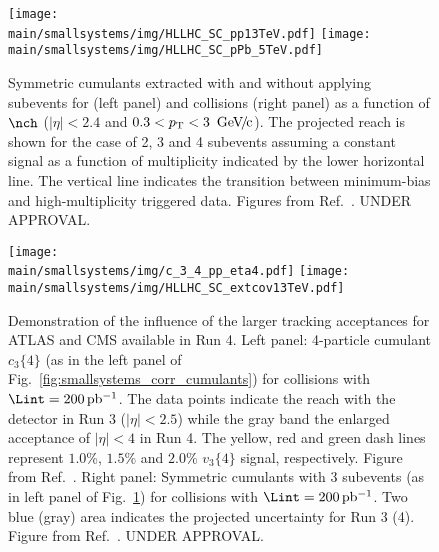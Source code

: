 \documentclass[../report.tex]{subfiles}
\providecommand{\main}{..}
\begin{document}
\begin{figure}[t!]
\centering
\texttt{[image: \\main/smallsystems/img/HLLHC\_SC\_pp13TeV.pdf]}
\texttt{[image: \\main/smallsystems/img/HLLHC\_SC\_pPb\_5TeV.pdf]}
\caption{Symmetric cumulants extracted with and without applying subevents for \pp (left panel) and \pPb collisions (right panel) as a function of $\nch$ ($|\eta| < 2.4$ and $0.3 < \pT < \unit[3]{\UGeVc}$). The projected reach is shown for the case of 2, 3 and 4 subevents assuming a constant signal as a function of multiplicity indicated by the lower horizontal line. The vertical line indicates the transition between minimum-bias and high-multiplicity triggered data. Figures from Ref.~\cite{CMS-PAS-FTR-18-026}. UNDER APPROVAL.}
\label{fig:smallsystems_corr_symmetriccumulants}
\end{figure}

\begin{figure}[t]
\centering
\texttt{[image: \\main/smallsystems/img/c\_3\_4\_pp\_eta4.pdf]}
\texttt{[image: \\main/smallsystems/img/HLLHC\_SC\_extcov13TeV.pdf]}
\caption{Demonstration of the influence of the larger tracking acceptances for ATLAS and CMS available in Run 4. Left panel: 4-particle cumulant $c_3\{4\}$ (as in the left panel of Fig.~\ref{fig:smallsystems_corr_cumulants}) for \pp collisions with $\Lint = \unit[200]{pb^{-1}}$. The data points indicate the reach with the detector in Run 3 ($|\eta| < 2.5$) while the gray band the enlarged acceptance of $|\eta| < 4$ in Run 4. The yellow, red and green dash lines represent $1.0\%$, $1.5\%$ and $2.0\%$ $v_3\{4\}$ signal, respectively. Figure from Ref.~\cite{ATL-PHYS-PUB-2018-020}. Right panel: Symmetric cumulants with 3 subevents (as in left panel of Fig.~\ref{fig:smallsystems_corr_symmetriccumulants}) for \pp collisions with $\Lint = \unit[200]{pb^{-1}}$. Two blue (gray) area indicates the projected uncertainty for Run 3 (4). Figure from Ref.~\cite{}. UNDER APPROVAL.}
\label{fig:smallsystems_corr_eta4}
\end{figure}
\end{document}
